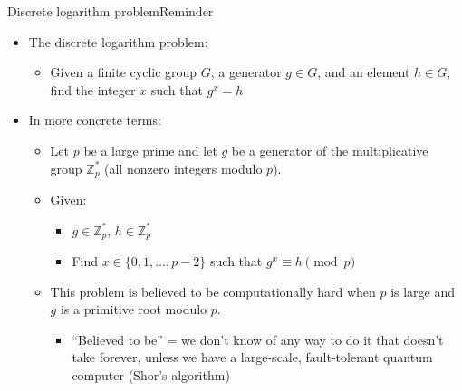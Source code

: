 \ifdefined\PRESENTATION\else\PassOptionsToClass{handout}{beamer}\fi\documentclass[aspectratio=169, lualatex]{beamer}
\begin{document}
\begin{frame}{Discrete logarithm problem}{Reminder}
	\begin{itemize}
		\item The discrete logarithm problem:
		      \begin{itemize}
			      \item Given a finite cyclic group $G$, a generator $g \in G$, and an element
			            $h \in G$, find the integer $x$ such that $g^{x}=h$
		      \end{itemize}
		\item In more concrete terms:
		      \begin{itemize}
			      \item Let $p$ be a large prime and let $g$ be a generator of the multiplicative
			            group $\mathbb{Z}_{p}^{*}$ (all nonzero integers modulo $p$).
			      \item Given:
			            \begin{itemize}
				            \item $g \in \mathbb{Z}_{p}^{*}$, $h \in \mathbb{Z}_{p}^{*}$

				            \item Find $x \in \{0, 1, \ldots, p-2\}$ such that $g^{x} \equiv h \pmod
					                  {p}$
			            \end{itemize}
			      \item This problem is believed to be computationally hard when $p$ is large
			            and $g$ is a primitive root modulo $p$.
			            \begin{itemize}
				            \item ``Believed to be'' = we don't know of any way to do it that doesn't
				                  take forever, unless we have a large-scale, fault-tolerant quantum computer (Shor's
				                  algorithm)
			            \end{itemize}
		      \end{itemize}
	\end{itemize}
\end{frame}
\end{document}
